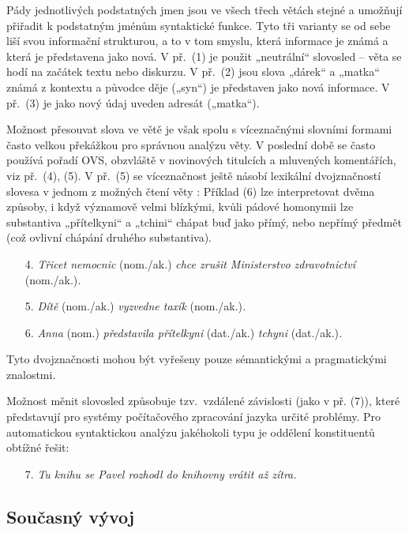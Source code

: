 \begin{multicols}{2}
Pády jednotlivých podstatných jmen jsou ve všech třech větách stejné a umožňují přiřadit k podstatným jménům syntaktické funkce. Tyto tři varianty se od sebe liší svou informační strukturou, a to v tom smyslu, která informace je známá a která je představena jako nová. V př.~(1) je použit „neutrální“ slovosled – věta se hodí na začátek textu nebo diskurzu. V př.~(2) jsou slova „dárek“ a „matka“ známá z kontextu a původce děje („syn“) je představen jako nová informace. V př.~(3) je jako nový údaj uveden adresát („matka“).

Možnost přesouvat slova ve větě je však spolu s víceznačnými slovními formami často velkou překážkou pro správnou analýzu věty. V poslední době se často používá pořadí OVS, obzvláště v novinových titulcích a mluvených komentářích, viz př.~(4), (5). V př.~(5) se víceznačnost ještě násobí lexikální dvojznačností slovesa v jednom z možných čtení věty \cite{Note4}: Příklad (6) lze interpretovat dvěma způsoby, i když významově velmi blízkými, kvůli pádové homonymii lze substantiva „přítelkyni“ a „tchini“ chápat buď jako přímý, nebo nepřímý předmět (což ovlivní chápání druhého substantiva).

\begin{enumerate}
\item[4.] \textit{Třicet nemocnic} (nom./ak.) \textit{chce zrušit Ministerstvo zdravotnictví} (nom./ak.)\textit{.}
\item[5.] \textit{Dítě} (nom./ak.) \textit{vyzvedne taxík} (nom./ak.)\textit{.}
\item[6.] \textit{Anna} (nom.) \textit{představila přítelkyni} (dat./ak.) \textit{tchyni} (dat./ak.)\textit{.}
\end{enumerate}

Tyto dvojznačnosti mohou být vyřešeny pouze sémantickými a pragmatickými znalostmi.

Možnost měnit slovosled způsobuje tzv.~vzdálené závislosti (jako v př. (7)), které představují pro systémy počítačového zpracování jazyka určité problémy. Pro automatickou syntaktickou analýzu jakéhokoli typu je oddělení konstituentů obtížné řešit:

\vspace*{-2mm}
\begin{enumerate}
\item[7.]	\textit{Tu knihu se Pavel rozhodl do knihovny vrátit až zítra.}
\end{enumerate}

\subsection{Současný vývoj}


\end{multicols}
